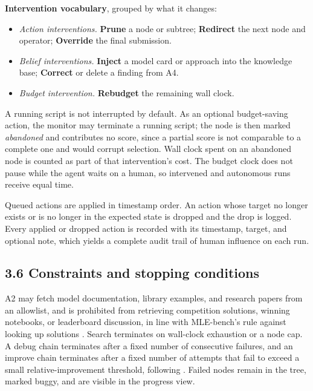 \documentclass[11pt]{article}
\begin{document}
\textbf{Intervention vocabulary}, grouped by what it changes:
\begin{itemize}[leftmargin=*,itemsep=0.15em]
    \item \emph{Action interventions.} \textbf{Prune} a node or subtree;
          \textbf{Redirect} the next node and operator; \textbf{Override} the final
          submission.
    \item \emph{Belief interventions.} \textbf{Inject} a model card or approach into
          the knowledge base; \textbf{Correct} or delete a finding from A4.
    \item \emph{Budget intervention.} \textbf{Rebudget} the remaining wall clock.
\end{itemize}

A running script is not interrupted by default. As an optional budget-saving action,
the monitor may terminate a running script; the node is then marked
\emph{abandoned} and contributes no score, since a partial score is not comparable to
a complete one and would corrupt selection. Wall clock spent on an abandoned node is
counted as part of that intervention's cost. The budget clock does not pause while
the agent waits on a human, so intervened and autonomous runs receive equal time.

Queued actions are applied in timestamp order. An action whose target no longer
exists or is no longer in the expected state is dropped and the drop is logged.
Every applied or dropped action is recorded with its timestamp, target, and optional
note, which yields a complete audit trail of human influence on each run.

\subsection*{3.6 Constraints and stopping conditions}

A2 may fetch model documentation, library examples, and research papers from an
allowlist, and is prohibited from retrieving competition solutions, winning
notebooks, or leaderboard discussion, in line with MLE-bench's rule against looking up
solutions \cite{mlebench}. Search terminates on wall-clock exhaustion or a node cap.
A debug chain terminates after a fixed number of consecutive failures, and an improve
chain terminates after a fixed number of attempts that fail to exceed a small
relative-improvement threshold, following \cite{mlmaster}. Failed nodes remain in the
tree, marked buggy, and are visible in the progress view.
\end{document}
